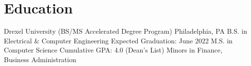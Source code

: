 \section{Education}

\education
  {Drexel University (BS/MS Accelerated Degree Program)}
  {Philadelphia, PA}
  {B.S. in Electrical \& Computer Engineering}
  {Expected Graduation: June 2022}
  {M.S. in Computer Science}
  {Cumulative GPA: 4.0 (Dean's List)}
  {Minors in Finance, Business Administration}